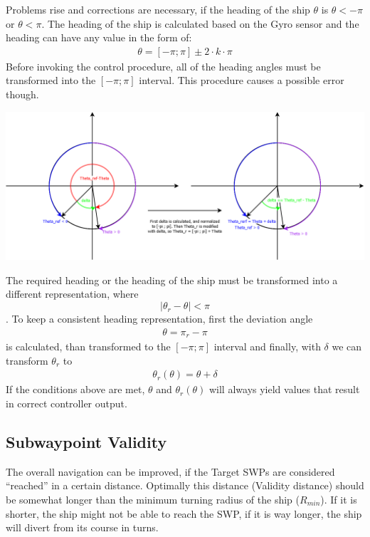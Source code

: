 Problems rise and corrections are necessary, if the heading of the ship $\theta$ is $\theta < -\pi$ or $\theta < \pi$. The heading of the ship is calculated based on the Gyro sensor and the heading can have any value in the form of: 
\begin{align}
\theta = [-{\pi} ; \pi ] \pm 2 \cdot k \cdot \pi
\end{align}
Before invoking the control procedure, all of the heading angles must be transformed into the $[-\pi ; \pi]$ interval.
This procedure causes a possible error though.

\includegraphics[width=\textwidth]{img/ControlStrategyFigures/Headings.png}

The required heading or the heading of the ship must be transformed into a different representation, where $$|\theta_{r}-\theta| < \pi$$. To keep a consistent heading representation, first the deviation angle 
\begin{align}
\theta = \pi_{r}-\pi
\end{align} is calculated, than transformed to the $[-\pi;\pi]$ interval and finally, with $\delta$ we can transform $\theta_{r}$ to 
\begin{align}
\theta_{r}(\theta) = \theta + \delta
\end{align}
If the conditions above are met, $\theta$ and $\theta_r(\theta)$ will always yield values that result in correct controller output.

\subsection{Subwaypoint Validity}

The overall navigation can be improved, if the Target SWPs are considered ``reached'' in a certain distance. Optimally this distance (Validity distance) should be somewhat longer than the minimum turning radius of the ship ($R_{min}$). If it is shorter, the ship might not be able to reach the SWP, if it is way longer, the ship will divert from its course in turns.

